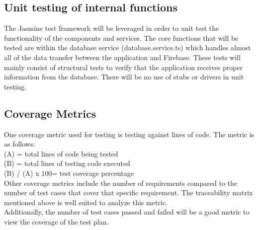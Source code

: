 \documentclass[12pt,fleqn]{article}
\begin{document}
\subsection{Unit testing of internal functions}
The Jasmine test framework will be leveraged in order to unit test the functionality of the components and services. The core functions that will be tested are within the database service (database.service.ts) which handles almost all of the data transfer between the application and Firebase. These tests will mainly consist of structural tests to verify that the application receives proper information from the database. There will be no use of stubs or drivers in unit testing.

{\color{red}\subsection{Coverage Metrics}

One coverage metric used for testing is testing against lines of code. The metric is as follows: \\
(A) = total lines of code being tested \\
(B) = total lines of testing code executed \\
(B) / (A)  x 100= test coverage percentage\\

Other coverage metrics include the number of requirements compared to the number of test cases that cover that specific requirement.  The traceability matrix mentioned above is well suited to analyze this metric.  \\

Additionally, the number of test cases passed and failed will be a good metric to view the coverage of the test plan.  }
\end{document}
